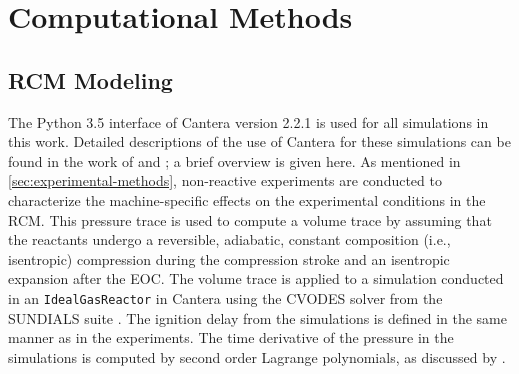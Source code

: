 \documentclass[12pt]{../ussci}
\begin{document}

\section{Computational Methods}\label{sec:computational-methods}
\subsection{RCM Modeling}\label{sec:experimental-modeling}

The Python 3.5 interface of Cantera \autocite{cantera} version 2.2.1 is used for
all simulations in this work. Detailed descriptions of the use of Cantera for
these simulations can be found in the work of \textcite{Weber2016a} and
\textcite{Dames2016}; a brief overview is given here. As mentioned in
\cref{sec:experimental-methods}, non-reactive experiments are conducted to
characterize the machine-specific effects on the experimental conditions in the
RCM. This pressure trace is used to compute a volume trace by assuming that the
reactants undergo a reversible, adiabatic, constant composition (i.e.,
isentropic) compression during the compression stroke and an isentropic
expansion after the EOC. The volume trace is applied to a simulation conducted
in an \verb|IdealGasReactor| in Cantera \autocite{cantera} using the CVODES
solver from the SUNDIALS suite \autocite{Hindmarsh2005}. The ignition delay from
the simulations is defined in the same manner as in the experiments. The time
derivative of the pressure in the simulations is computed by second order
Lagrange polynomials, as discussed by \textcite{Chapra2010}.
\end{document}
